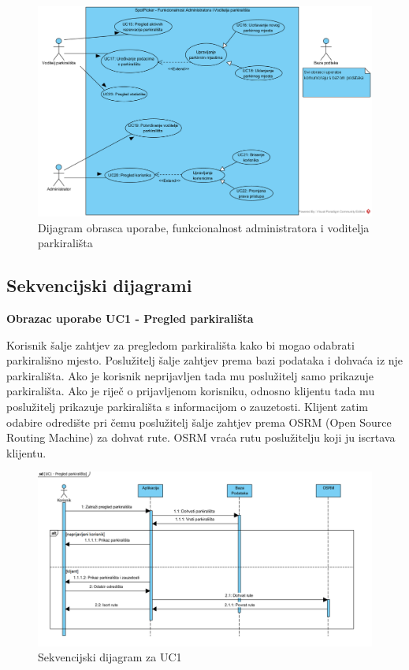 					\begin{figure}[H]
						\centering
						\includegraphics[width=\textwidth]{slike/UCD2.PNG} 
						\caption{Dijagram obrasca uporabe, funkcionalnost administratora i voditelja parkirališta}
						\label{fig:promjene7} 
					\end{figure}
				\eject		
				
			\subsection{Sekvencijski dijagrami}
			
				\textbf {Obrazac uporabe UC1 - Pregled parkirališta}
				
				\vspace{1cm}
				
				 Korisnik šalje zahtjev za pregledom parkirališta kako bi mogao odabrati parkirališno mjesto. Poslužitelj šalje zahtjev prema bazi podataka i dohvaća iz nje parkirališta. Ako je korisnik neprijavljen tada mu poslužitelj samo prikazuje parkirališta. Ako je riječ o prijavljenom korisniku, odnosno klijentu tada mu poslužitelj prikazuje parkirališta s informacijom o zauzetosti. Klijent zatim odabire odredište pri čemu poslužitelj šalje zahtjev prema OSRM (Open Source Routing Machine) za dohvat rute. OSRM vraća rutu poslužitelju koji ju iscrtava klijentu.  
				
				\vspace{1cm}
				
				\begin{figure}[H]
					\centering
					\includegraphics[width=\textwidth]{slike/SD_UC1.JPG} 
					\caption{Sekvencijski dijagram za UC1}
					\label{fig:promjene8} 
				\end{figure}
				
